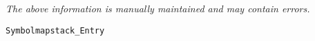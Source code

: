 \label{pkg:symbolmapstack\_entry}

{\tiny \it The above information is manually maintained and may contain errors.}
\begin{verbatim}
Symbolmapstack_Entry
\end{verbatim}
